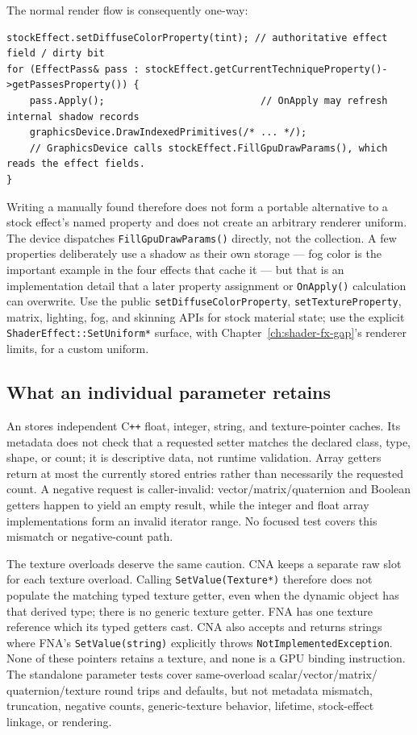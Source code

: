 The normal render flow is consequently one-way:

\begin{lstlisting}
stockEffect.setDiffuseColorProperty(tint); // authoritative effect field / dirty bit
for (EffectPass& pass : stockEffect.getCurrentTechniqueProperty()->getPassesProperty()) {
    pass.Apply();                           // OnApply may refresh internal shadow records
    graphicsDevice.DrawIndexedPrimitives(/* ... */);
    // GraphicsDevice calls stockEffect.FillGpuDrawParams(), which reads the effect fields.
}
\end{lstlisting}

Writing a manually found  therefore does not form a portable
alternative to a stock effect's named property and does not create an arbitrary renderer uniform.
The device dispatches \texttt{FillGpuDrawParams()} directly, not the collection. A few
properties deliberately use a shadow as their own storage --- fog color is the important example
in the four effects that cache it --- but that is an implementation detail that a later property
assignment or \texttt{OnApply()} calculation can overwrite. Use the public
\texttt{setDiffuseColorProperty}, \texttt{setTextureProperty}, matrix, lighting, fog, and
skinning APIs for stock material state; use the explicit \texttt{ShaderEffect::SetUniform*}
surface, with Chapter~\ref{ch:shader-fx-gap}'s renderer limits, for a custom uniform.

\subsection{What an individual parameter retains}

An  stores independent C\texttt{++} float, integer, string, and
texture-pointer caches. Its metadata does not check that a requested setter matches the declared
class, type, shape, or count; it is descriptive data, not runtime validation. Array getters
return at most the currently stored entries rather than necessarily the requested count. A
negative request is caller-invalid: vector/matrix/quaternion and Boolean getters happen to yield
an empty result, while the integer and float array implementations form an invalid iterator range.
No focused test covers this mismatch or negative-count path.

The texture overloads deserve the same caution. CNA keeps a separate raw slot for each texture
overload. Calling \texttt{SetValue(Texture*)} therefore does not populate the matching typed
texture getter, even when the dynamic object has that derived type; there is no generic texture
getter. FNA has one texture reference which its typed getters cast. CNA also accepts and returns
strings where FNA's \texttt{SetValue(string)} explicitly throws
\texttt{NotImplementedException}. None of these pointers retains a texture, and none is a GPU
binding instruction. The standalone parameter tests cover same-overload scalar/vector/matrix/
quaternion/texture round trips and defaults, but not metadata mismatch, truncation, negative
counts, generic-texture behavior, lifetime, stock-effect linkage, or rendering.

